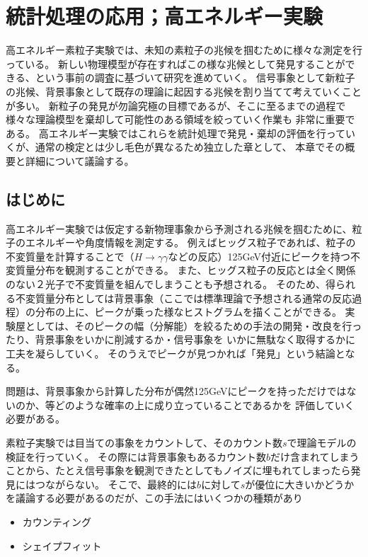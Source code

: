 
\chapter{統計処理の応用；高エネルギー実験}

高エネルギー素粒子実験では、未知の素粒子の兆候を掴むために様々な測定を行っている。
新しい物理模型が存在すればこの様な兆候として発見することができる、という事前の調査に基づいて研究を進めていく。
信号事象として新粒子の兆候、背景事象として既存の理論に起因する兆候を割り当てて考えていくことが多い。
新粒子の発見が勿論究極の目標であるが、そこに至るまでの過程で様々な理論模型を棄却して可能性のある領域を絞っていく作業も
非常に重要である。
高エネルギー実験ではこれらを統計処理で発見・棄却の評価を行っていくが、通常の検定とは少し毛色が異なるため独立した章として、
本章でその概要と詳細について議論する。

\section{はじめに}

高エネルギー実験では仮定する新物理事象から予測される兆候を掴むために、粒子のエネルギーや角度情報を測定する。
例えばヒッグス粒子であれば、粒子の不変質量を計算することで（$H\to \gamma\gamma$などの反応）125GeV付近にピークを持つ不変質量分布を観測することができる。
また、ヒッグス粒子の反応とは全く関係のない２光子で不変質量を組んでしまうことも予想される。
そのため、得られる不変質量分布としては背景事象（ここでは標準理論で予想される通常の反応過程）の分布の上に、ピークが乗った様なヒストグラムを描くことができる。
実験屋としては、そのピークの幅（分解能）を絞るための手法の開発・改良を行ったり、背景事象をいかに削減するか・信号事象を
いかに無駄なく取得するかに工夫を凝らしていく。
そのうえでピークが見つかれば「発見」という結論となる。

問題は、背景事象から計算した分布が偶然125GeVにピークを持っただけではないのか、等どのような確率の上に成り立っていることであるかを
評価していく必要がある。

素粒子実験では目当ての事象をカウントして、そのカウント数$s$で理論モデルの検証を行っていく。
その際には背景事象もあるカウント数$b$だけ含まれてしまうことから、たとえ信号事象を観測できたとしてもノイズに埋もれてしまったら発見にはつながらない。
そこで、最終的には$b$に対して$s$が優位に大きいかどうかを議論する必要があるのだが、この手法にはいくつかの種類があり

\begin{itemize}
  \item カウンティング
  \item シェイプフィット
\end{itemize}

